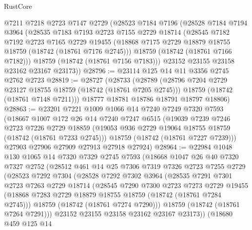 \begin{lexlean}{RustCore}
\begin{coremodule}
    @7211
    @7218
    @2723
    @7147
    @2729
    (@28523
      @7184
      @7196
      (@28528
        @7184
        @7194
        @3964
        (@28535
          @7183
          @7193
          @2723
          @7155
          @2729
          @18714
          (@28545
            @7182
            @7192
            @2723
            @7165
            @2729
            @19455
            (@18868 @7175 @2729 @18879 @18755 @18759 (@18742 (@18761 @7176 @2745)))
            @18759
            (@18742 (@18761 @7166 @7182)))
          @18759
          (@18742 (@18761 @7156 @7183)))
        @23152
        @23155
        @23158
        @23162
        @23167
        @23173))
@28796 := @23114 @125 @14 @11 @3356 @2745 @2762 @2723
@28819 := @28727
    (@28733
      (@28789
        (@28796 @7204 @2729 @23127 @18755 @18759 (@18742 (@18761 @7205 @2745)))
        @18759
        (@18742 (@18761 @7148 @7211)))
      @18777
      @18781
      @18786
      @18791
      @18797
      @18806)
@28863 := @23201
    @7221
    @1009
    @1066
    @14
    @7240
    @7249
    @7320
    @7593
    (@18667
      @1007
      @172
      @26
      @14
      @7240
      @7247
      @6515
      (@19039
        @7239
        @7246
        @2723
        @7226
        @2729
        @18859
        (@19053 @936 @2729 @19064 @18755 @18759 (@18742 (@18761 @7233 @2745)))
        @18759
        (@18742 (@18761 @7227 @7239)))
      @27903
      @27906
      @27909
      @27913
      @27918
      @27924)
@28964 := @22984
    @1048
    @130
    @1065
    @14
    @7320
    @7329
    @2745
    @7593
    (@18668
      @1047
      @26
      @40
      @7320
      @7327
      @2752
      (@28512
        @461
        @14
        @25
        @7306
        @7319
        @7326
        @2723
        @7255
        @2729
        (@28523
          @7292
          @7304
          (@28528
            @7292
            @7302
            @3964
            (@28535
              @7291
              @7301
              @2723
              @7263
              @2729
              @18714
              (@28545
                @7290
                @7300
                @2723
                @7273
                @2729
                @19455
                (@18868 @7283 @2729 @18879 @18755 @18759 (@18742 (@18761 @7284 @2745)))
                @18759
                (@18742 (@18761 @7274 @7290)))
              @18759
              (@18742 (@18761 @7264 @7291)))
            @23152
            @23155
            @23158
            @23162
            @23167
            @23173))
        (@18680
          @459
          @125
          @14

\end{coremodule}
\end{lexlean}
